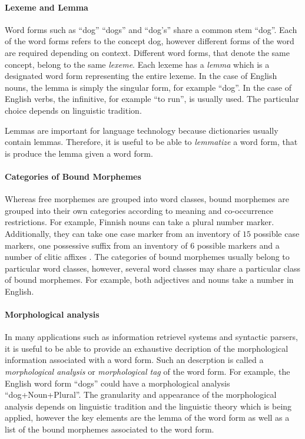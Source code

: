 \paragraph{Lexeme and Lemma} Word forms such as ``dog'' ``dogs'' and
``dog's'' share a common stem ``dog''. Each of the word forms refers
to the concept {\sc dog}, however different forms of the word are
required depending on context. Different word forms, that denote the
same concept, belong to the same {\it lexeme}. Each lexeme has a {\it
  lemma} which is a designated word form representing the entire
lexeme. In the case of English nouns, the lemma is simply the singular
form, for example ``dog''. In the case of English verbs, the
infinitive, for example ``to run'', is usually used. The particular
choice depends on linguistic tradition. 

Lemmas are important for language technology because dictionaries
usually contain lemmas. Therefore, it is useful to be able to {\it
  lemmatize} a word form, that is produce the lemma given a word form.

\paragraph{Categories of Bound Morphemes} Whereas free morphemes are
grouped into word classes, bound morphemes are grouped into their own
categories according to meaning and co-occurrence restrictions. For
example, Finnish nouns can take a plural number
marker. Additionally, they can take one case marker from an inventory
of $15$ possible case markers, one possessive suffix from an inventory
of $6$ possible markers and a number of clitic affixes
\citep{Hakulinen2004}. The categories of bound morphemes usually
belong to particular word classes, however, several word classes may
share a particular class of bound morphemes. For example, both
adjectives and nouns take a number in English.

\paragraph{Morphological analysis} In many applications such as
information retrievel systems and syntactic parsers, it is useful to
be able to provide an exhaustive decription of the morphological
information associated with a word form. Such an descrption is called
a {\it morphological analysis} or {\it morphological tag} of the word
form. For example, the English word form ``dogs'' could have a
morphological analysis ``dog+Noun+Plural''. The granularity and
appearance of the morphological analysis depends on linguistic
tradition and the linguistic theory which is being applied, however
the key elements are the lemma of the word form as well as a list of
the bound morphemes associated to the word form.

